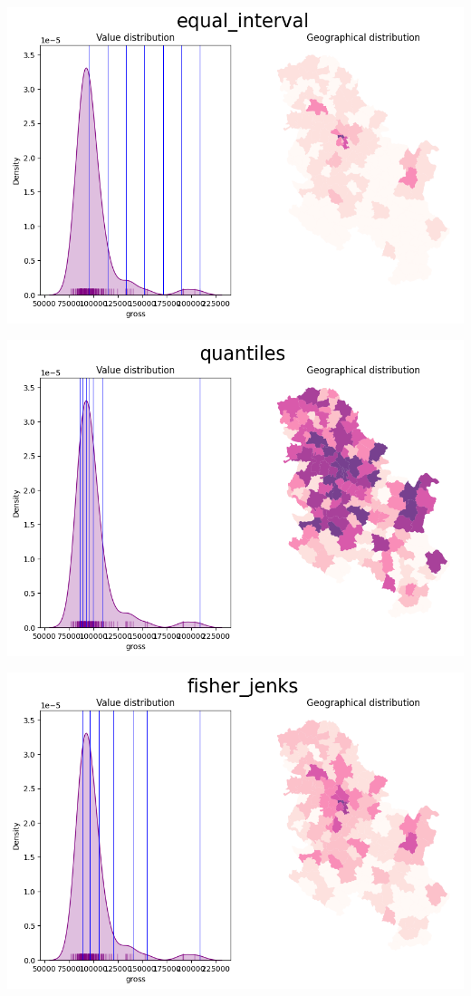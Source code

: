 \documentclass[
  letterpaper,
  DIV=11,
  numbers=noendperiod]{scrreprt}
\begin{document}
\includegraphics{labs/w02_maps_files/figure-pdf/cell-35-output-1.png}

\includegraphics{labs/w02_maps_files/figure-pdf/cell-35-output-2.png}

\includegraphics{labs/w02_maps_files/figure-pdf/cell-35-output-3.png}
\end{document}
